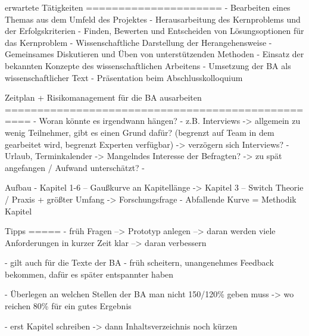 erwartete Tätigkeiten
=====================
- Bearbeiten eines Themas aus dem Umfeld des Projektes
- Herausarbeitung des Kernproblems und der Erfolgskriterien
- Finden, Bewerten und Entscheiden von Lösungsoptionen für das Kernproblem
- Wissenschaftliche Darstellung der Herangehensweise
- Gemeinsames Diskutieren und Üben von unterstützenden Methoden
- Einsatz der bekannten Konzepte des wissenschaftlichen Arbeitens
- Umsetzung der BA als wissenschaftlicher Text
- Präsentation beim Abschlusskolloquium

Zeitplan + Risikomanagement für die BA ausarbeiten
==================================================
- Woran könnte es irgendwann hängen?
- z.B. Interviews
    -> allgemein zu wenig Teilnehmer, gibt es einen Grund dafür? (begrenzt auf Team in dem gearbeitet wird, begrenzt Experten verfügbar)
    -> verzögern sich Interviews? - Urlaub, Terminkalender
    -> Mangelndes Interesse der Befragten?
    -> zu spät angefangen / Aufwand unterschätzt?
- 

Aufbau
-	Kapitel 1-6 – Gaußkurve an Kapitellänge
-> Kapitel 3 – Switch Theorie / Praxis + größter Umfang -> Forschungsfrage
-	Abfallende Kurve = Methodik Kapitel

Tipps
=====
- früh Fragen
--> Prototyp anlegen
--> daran werden viele Anforderungen in kurzer Zeit klar
--> daran verbessern

- gilt auch für die Texte der BA
- früh scheitern, unangenehmes Feedback bekommen, dafür es später entspannter haben

- Überlegen an welchen Stellen der BA man nicht 150/120\% geben muss
-> wo reichen 80\% für ein gutes Ergebnis

- erst Kapitel schreiben
-> dann Inhaltsverzeichnis noch kürzen